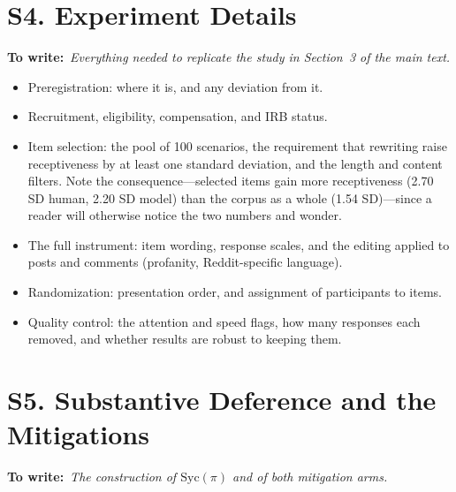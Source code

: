 \documentclass[letterpaper]{article} %
\newcommand{\needs}[1]{%
  \par\smallskip\noindent\textbf{To write:}\ \textit{#1}\par\smallskip}
\begin{document}
\section{S4. Experiment Details}

\needs{Everything needed to replicate the study in Section~3 of the main text.}

\begin{itemize}
  \item Preregistration: where it is, and any deviation from it.
  \item Recruitment, eligibility, compensation, and IRB status.
  \item Item selection: the pool of 100 scenarios, the requirement that
        rewriting raise receptiveness by at least one standard deviation, and
        the length and content filters. Note the consequence---selected items
        gain more receptiveness (2.70 SD human, 2.20 SD model) than the corpus
        as a whole (1.54 SD)---since a reader will otherwise notice the two
        numbers and wonder.
  \item The full instrument: item wording, response scales, and the editing
        applied to posts and comments (profanity, Reddit-specific language).
  \item Randomization: presentation order, and assignment of participants to
        items.
  \item Quality control: the attention and speed flags, how many responses each
        removed, and whether results are robust to keeping them.
\end{itemize}

\section{S5. Substantive Deference and the Mitigations}

\needs{The construction of $\mathrm{Syc}(\pi)$ and of both mitigation arms.}
\end{document}

